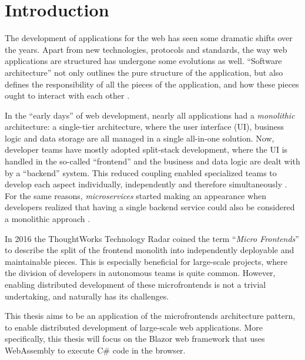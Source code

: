 
\section{Introduction}
\label{sec:introduction}

The development of applications for the web has seen some dramatic shifts over
the years. Apart from new technologies, protocols and standards, the way web
applications are structured has undergone some evolutions as well. ``Software
architecture'' not only outlines the pure structure of the application, but also
defines the responsibility of all the pieces of the application, and how these
pieces ought to interact with each other \autocite{Fedorov_etal_1998}.

In the ``early days'' of web development, nearly all applications had a
\textit{monolithic} architecture: a single-tier architecture, where the user
interface (UI), business logic and data storage are all managed in a single
all-in-one solution. Now, developer teams have mostly adopted split-stack
development, where the UI is handled in the so-called ``frontend'' and the
business and data logic are dealt with by a ``backend'' system. This reduced
coupling enabled specialized teams to develop each aspect individually,
independently and therefore simultaneously \autocite{Dunkley_2016}. For the same
reasons, \textit{microservices} started making an appearance when developers
realized that having a single backend service could also be considered a
monolithic approach \autocite{Fowler_Microservices_2014}.

In 2016 the ThoughtWorks Technology Radar \autocite{ThoughtWorks_2020} coined
the term ``\textit{Micro Frontends}'' to describe the split of the frontend
monolith into independently deployable and maintainable pieces. This is
especially beneficial for large-scale projects, where the division of developers
in autonomous teams is quite common. However, enabling distributed development
of these microfrontends is not a trivial undertaking, and naturally has its
challenges.

This thesis aims to be an application of the microfrontends architecture
pattern, to enable distributed development of large-scale web applications. More
specifically, this thesis will focus on the
Blazor web framework that uses
WebAssembly to execute
C\# code in the browser.   

